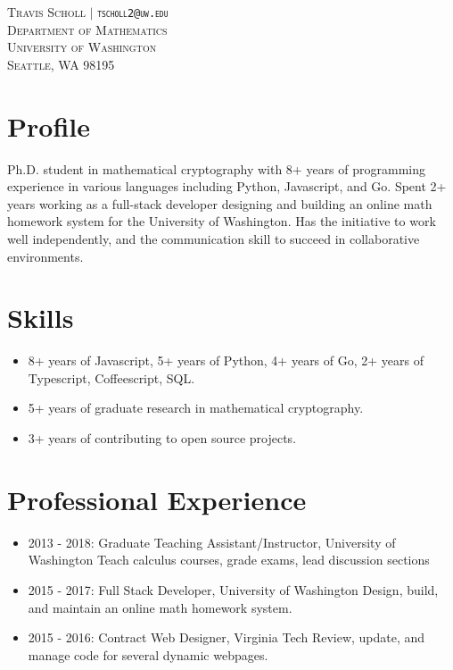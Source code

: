\documentclass{article}
\begin{document}
	
	\vspace*{-1in}
	
	\begin{center}
	\textsc{
		Travis Scholl $\vert$ {\tt tscholl2@uw.edu} \\
		Department of Mathematics \\
		University of Washington \\
		Seattle, WA 98195
	}
	\end{center}
	
	\section{Profile}
	
	Ph.D. student in mathematical cryptography with 8+ years of programming experience in various languages including Python, Javascript, and Go. Spent 2+ years working as a full-stack developer designing and building an online math homework system for the University of Washington. Has the initiative to work well independently, and the communication skill to succeed in collaborative environments.
	
	\section{Skills}
	
	\begin{itemize} 
		\item 8+ years of Javascript, 5+ years of Python, 4+ years of Go, 2+ years of Typescript, Coffeescript, SQL.
		\item 5+ years of graduate research in mathematical cryptography.
		\item 3+ years of contributing to open source projects.
	\end{itemize}

	\section{Professional Experience}
	
	\begin{itemize}  
		\item 2013 - 2018: Graduate Teaching Assistant/Instructor, University of Washington
			\subitem Teach calculus courses, grade exams, lead discussion sections
		\item 2015 - 2017: Full Stack Developer, University of Washington
			\subitem Design, build, and maintain an online math homework system.
		\item 2015 - 2016: Contract Web Designer, Virginia Tech
			\subitem Review, update, and manage code for several dynamic webpages.
	\end{itemize}
	
\end{document}

